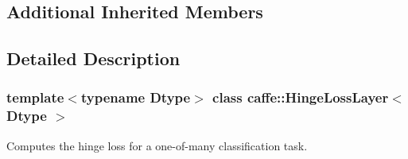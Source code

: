 \subsection*{Additional Inherited Members}


\subsection{Detailed Description}
\subsubsection*{template$<$typename Dtype$>$\newline
class caffe\+::\+Hinge\+Loss\+Layer$<$ Dtype $>$}

Computes the hinge loss for a one-\/of-\/many classification task. 


